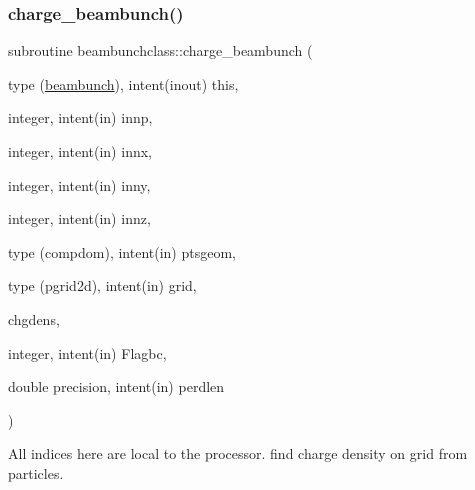 \subsubsection{\texorpdfstring{charge\_beambunch()}{charge\_beambunch()}}
{\footnotesize\ttfamily subroutine beambunchclass\+::charge\+\_\+beambunch (\begin{DoxyParamCaption}\item[{type (\mbox{\hyperlink{namespacebeambunchclass_structbeambunchclass_1_1beambunch}{beambunch}}), intent(inout)}]{this,  }\item[{integer, intent(in)}]{innp,  }\item[{integer, intent(in)}]{innx,  }\item[{integer, intent(in)}]{inny,  }\item[{integer, intent(in)}]{innz,  }\item[{type (compdom), intent(in)}]{ptsgeom,  }\item[{type (pgrid2d), intent(in)}]{grid,  }\item[{}]{chgdens,  }\item[{integer, intent(in)}]{Flagbc,  }\item[{double precision, intent(in)}]{perdlen }\end{DoxyParamCaption})}



All indices here are local to the processor. find charge density on grid from particles. 

